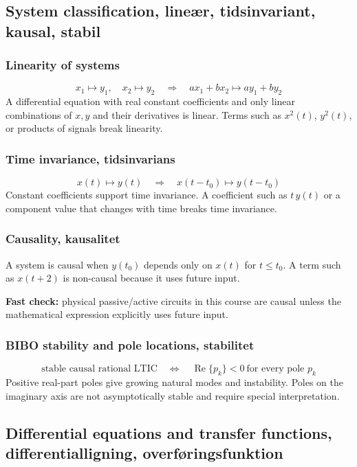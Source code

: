 \subsection{System classification, lineær, tidsinvariant, kausal, stabil}

\subsubsection{Linearity of systems}
\[
x_1\mapsto y_1,\quad x_2\mapsto y_2
\quad\Rightarrow\quad
a x_1+b x_2\mapsto a y_1+b y_2
\]
A differential equation with real constant coefficients and only linear combinations of \(x,y\) and their derivatives is linear. Terms such as \(x^2(t)\), \(y^2(t)\), or products of signals break linearity.

\subsubsection{Time invariance, tidsinvarians}
\[
x(t)\mapsto y(t)\quad\Rightarrow\quad x(t-t_0)\mapsto y(t-t_0)
\]
Constant coefficients support time invariance. A coefficient such as \(t\,y(t)\) or a component value that changes with time breaks time invariance.

\subsubsection{Causality, kausalitet}
A system is causal when \(y(t_0)\) depends only on \(x(t)\) for \(t\leq t_0\). A term such as \(x(t+2)\) is non-causal because it uses future input.

\textbf{Fast check:} physical passive/active circuits in this course are causal unless the mathematical expression explicitly uses future input.

\subsubsection{BIBO stability and pole locations, stabilitet}
\[
\text{stable causal rational LTIC}\quad\Longleftrightarrow\quad \operatorname{Re}\{p_k\}<0\ \text{for every pole }p_k
\]
Positive real-part poles give growing natural modes and instability. Poles on the imaginary axis are not asymptotically stable and require special interpretation.

\subsection{Differential equations and transfer functions, differentialligning, overføringsfunktion}

